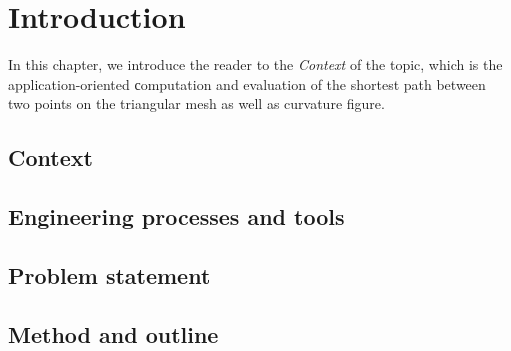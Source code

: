 
\chapter{Introduction}\label{chapter:introduction}


In this chapter, we introduce the reader to the \textit{Context} of the topic, which is the application-oriented сomputation and evaluation of the shortest path between two points on the triangular mesh as well as curvature figure. 



\section{Context}

  
\section{Engineering processes and tools}

\section{Problem statement} \label{section:problem}

\section{Method and outline}
